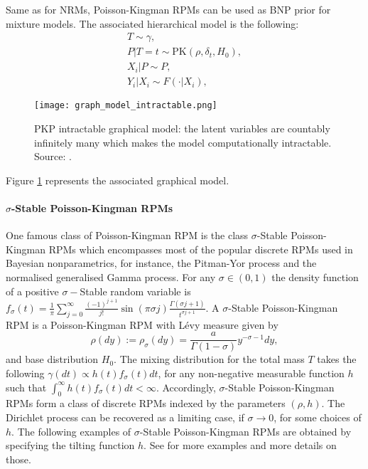 Same as for \glspl{NRM}, Poisson-Kingman \glspl{RPM} can be used as \gls{BNP} prior for mixture models. The associated hierarchical model is the following:
\begin{gather*}
T \sim \gamma, \\
P|T=t \sim \text{PK}(\rho, \delta_t, H_0), \\
X_i|P \sim P, \\
Y_i|X_i \sim F(\cdot|X_i),
\end{gather*}

\begin{figure}[h!]
\centering
    \texttt{[image: graph\_model\_intractable.png]} 
    \caption{\gls{PKP} intractable graphical model: the latent variables are countably infinitely many which makes the model computationally intractable. Source: \cite{LomeliThesis}.} 
    \label{fig:graph_model_intractable} 
\end{figure}
Figure \ref{fig:graph_model_intractable} represents the associated graphical model.

\paragraph{$\sigma$-Stable Poisson-Kingman \glspl{RPM}}
One famous class of Poisson-Kingman \gls{RPM} is the class $\sigma$-Stable Poisson-Kingman \glspl{RPM} which encompasses most of the popular discrete \glspl{RPM} used in Bayesian nonparametrics, for instance, the Pitman-Yor process and the normalised generalised Gamma process.
For any $\sigma \in (0,1)$ the density function of a positive  $\sigma-$Stable random variable is
$f_\sigma(t) = \frac{1}{\pi}\sum_{j=0}^\infty \frac{(-1)^{j+1}}{j!}\sin(\pi\sigma j)\frac{\Gamma(\sigma j+1)}{t^{\sigma j+1}}$. A $\sigma$-Stable Poisson-Kingman \gls{RPM} is a Poisson-Kingman \gls{RPM} with Lévy measure given by
\begin{equation} \label{eq:sigma_stable_PK}
\rho(dy) := \rho_\sigma(dy) = \frac{a}{\Gamma(1 - \sigma)}y^{-\sigma-1} dy,
\end{equation}
and base distribution $H_0$.
The mixing distribution for the total mass $T$ takes the following 
$\gamma(dt) \propto h(t) f_\sigma(t) dt$, for any non-negative measurable function $h$ such that
$\int_0^\infty{h(t)f_\sigma(t) dt} < \infty$.
Accordingly, $\sigma$-Stable Poisson-Kingman \glspl{RPM} form a class of discrete \glspl{RPM} indexed by the parameters $(\rho, h)$. The Dirichlet process can be recovered as a limiting case, if $\sigma \rightarrow 0$, for some choices of $h$. The following examples of $\sigma$-Stable Poisson-Kingman \glspl{RPM}  are obtained by specifying the tilting function $h$. See \cite{LomeliThesis} for more examples and more details on those.

